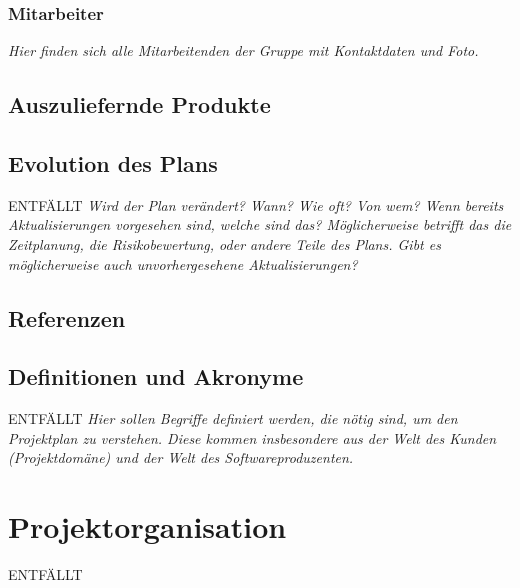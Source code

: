 \documentclass[fontsize=12pt,paper=a4,twoside]{scrartcl}
\begin{document}
\subsubsection{Mitarbeiter}
{\em Hier finden sich alle Mitarbeitenden der Gruppe mit Kontaktdaten und Foto.}

\subsection{Auszuliefernde Produkte}


\subsection{Evolution des Plans}
ENTFÄLLT
{\em Wird der Plan verändert? Wann? Wie oft? Von wem? Wenn bereits Aktualisierungen vorgesehen sind, welche sind das? Möglicherweise betrifft das die Zeitplanung, die Risikobewertung, oder andere Teile des Plans. Gibt es möglicherweise auch unvorhergesehene Aktualisierungen?}

\subsection{Referenzen}
%
%
%
%

{\renewcommand\section[2]{}

}

\subsection{Definitionen und Akronyme}
ENTFÄLLT
{\em Hier sollen Begriffe definiert werden, die nötig sind, um den
  Projektplan zu verstehen. Diese kommen insbesondere aus der Welt des
  Kunden (Projektdomäne) und der Welt des Softwareproduzenten.}

\section{Projektorganisation}
ENTFÄLLT
\end{document}

